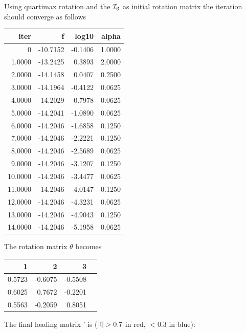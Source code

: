 Using quartimax rotation and the \(\mathcal{I}_3 \) as initial rotation matrix the iteration should converge as follows

\begin{tabular}{rrrr}
  \toprule
   iter   & f         & log10    &  alpha  \\
  \midrule
   0      &  -10.7152 &  -0.1406 &  1.0000 \\
   1.0000 &  -13.2425 &   0.3893 &  2.0000 \\
   2.0000 &  -14.1458 &   0.0407 &  0.2500 \\
   3.0000 &  -14.1964 &  -0.4122 &  0.0625 \\
   4.0000 &  -14.2029 &  -0.7978 &  0.0625 \\
   5.0000 &  -14.2041 &  -1.0890 &  0.0625 \\
   6.0000 &  -14.2046 &  -1.6858 &  0.1250 \\
   7.0000 &  -14.2046 &  -2.2221 &  0.1250 \\
   8.0000 &  -14.2046 &  -2.5689 &  0.0625 \\
   9.0000 &  -14.2046 &  -3.1207 &  0.1250 \\
  10.0000 &  -14.2046 &  -3.4477 &  0.0625 \\
  11.0000 &  -14.2046 &  -4.0147 &  0.1250 \\
  12.0000 &  -14.2046 &  -4.3231 &  0.0625 \\
  13.0000 &  -14.2046 &  -4.9043 &  0.1250 \\
  14.0000 &  -14.2046 &  -5.1958 &  0.0625 \\
  \bottomrule
\end{tabular}

The rotation matrix \(\theta \) becomes

\begin{tabular}{rrrr}
  \toprule
   1     & 2       & 3       \\
  \midrule
  0.5723 & -0.6075 & -0.5508 \\
  0.6025 &  0.7672 & -0.2201 \\
  0.5563 & -0.2059 &  0.8051 \\
  \bottomrule
\end{tabular}

The final loading matrix ' is (\( |\mathfrak{l}| > 0.7 \) in red, \(< 0.3 \) in blue):


